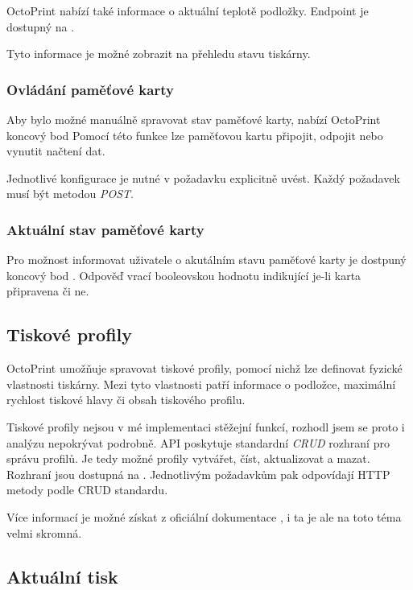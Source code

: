 OctoPrint nabízí také informace o aktuální teplotě podložky.
Endpoint je dostupný na .

Tyto informace je možné zobrazit na přehledu stavu tiskárny.

\subsubsection*{Ovládání paměťové karty}

Aby bylo možné manuálně spravovat stav paměťové karty, nabízí OctoPrint koncový bod 
Pomocí této funkce lze paměťovou kartu připojit, odpojit nebo vynutit načtení dat.

Jednotlivé konfigurace je nutné v požadavku explicitně uvést.
Každý požadavek musí být metodou \textit{POST}.

\subsubsection*{Aktuální stav paměťové karty}

Pro možnost informovat uživatele o akutálním stavu paměťové karty je dostpuný koncový bod .
Odpověď vrací booleovskou hodnotu indikující je-li karta připravena či ne.

\subsection{Tiskové profily}

OctoPrint umožňuje spravovat tiskové profily, pomocí nichž lze definovat fyzické vlastnosti tiskárny.
Mezi tyto vlastnosti patří informace o podložce, maximální rychlost tiskové hlavy či obsah tiskového profilu.

Tiskové profily nejsou v mé implementaci stěžejní funkcí, rozhodl jsem se proto i analýzu nepokrývat podrobně.
API poskytuje standardní \textit{CRUD} rozhraní pro správu profilů.
Je tedy možné profily vytvářet, číst, aktualizovat a mazat.
Rozhraní jsou dostupná na .
Jednotlivým požadavkům pak odpovídají HTTP metody podle CRUD standardu.

Více informací je možné získat z oficiální dokumentace \cite{octoprint-docs-printer-profiles}, i ta je ale na toto téma velmi skromná.

\subsection{Aktuální tisk}


